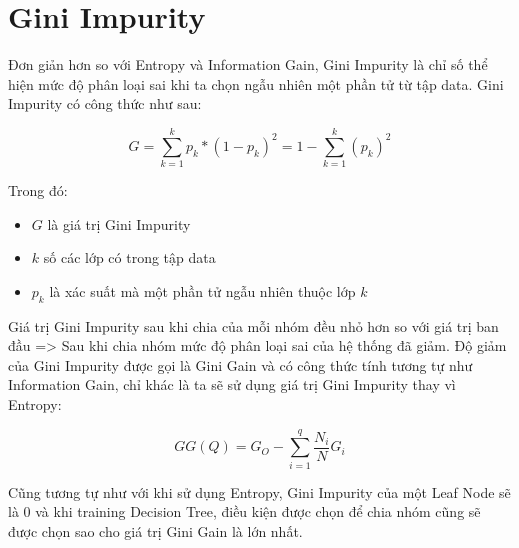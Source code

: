 \section{Gini Impurity}
Đơn giản hơn so với Entropy và Information Gain, Gini Impurity
là chỉ số thể hiện mức độ phân loại sai khi ta chọn ngẫu nhiên
một phần tử từ tập data. Gini Impurity có công thức như sau:

\begin{equation*}
    G = \sum_{k=1}^{k}p_k*(1-p_k)^2 = 1 - \sum_{k=1}^{k}(p_k)^2
\end{equation*}

Trong đó:
\begin{itemize}
    \item $G$ là giá trị Gini Impurity
    \item $k$ số các lớp có trong tập data
    \item $p_k$ là xác suất mà một phần tử ngẫu nhiên thuộc lớp $k$
\end{itemize}

Giá trị Gini Impurity sau khi chia của mỗi nhóm đều nhỏ hơn so với giá trị ban đầu
=> Sau khi chia nhóm mức độ phân loại sai của hệ thống đã giảm.
Độ giảm của Gini Impurity được gọi là Gini Gain và có công thức tính tương tự
như Information Gain, chỉ khác là ta sẽ sử dụng giá trị Gini Impurity thay vì Entropy:

\begin{equation*}
    GG(Q) = G_O - \sum_{i=1}^{q}\frac{N_i}{N}G_i
\end{equation*}

Cũng tương tự như với khi sử dụng Entropy, Gini Impurity của một Leaf Node
sẽ là 0 và khi training Decision Tree, điều kiện được chọn để chia nhóm
cũng sẽ được chọn sao cho giá trị Gini Gain là lớn nhất.
